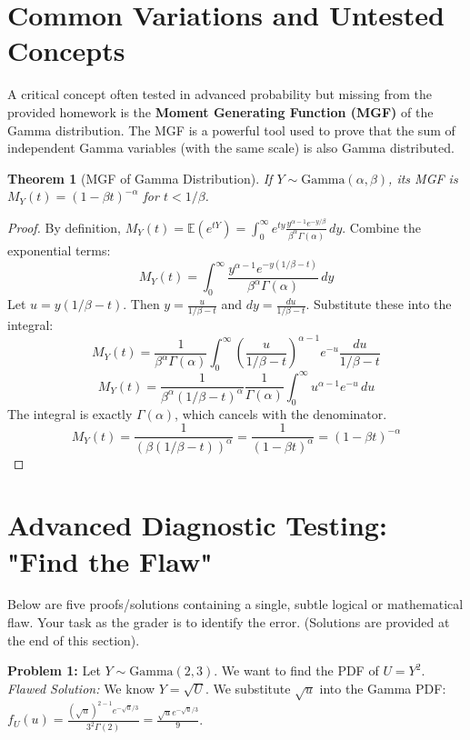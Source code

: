 \documentclass[11pt, a4paper]{article}
\newtheorem{theorem}{Theorem}[section]
\theoremstyle{definition}
\theoremstyle{remark}
\newcommand{\E}{\mathbb{E}}
\begin{document}
\section{Common Variations and Untested Concepts}

A critical concept often tested in advanced probability but missing from the provided homework is the \textbf{Moment Generating Function (MGF)} of the Gamma distribution. The MGF is a powerful tool used to prove that the sum of independent Gamma variables (with the same scale) is also Gamma distributed.

\begin{theorem}[MGF of Gamma Distribution]
If $Y \sim \text{Gamma}(\alpha, \beta)$, its MGF is $M_Y(t) = (1 - \beta t)^{-\alpha}$ for $t < 1/\beta$.
\end{theorem}
\begin{proof}
By definition, $M_Y(t) = \E(e^{tY}) = \int_0^\infty e^{ty} \frac{y^{\alpha-1}e^{-y/\beta}}{\beta^\alpha \Gamma(\alpha)} \, dy$.
Combine the exponential terms:
\[ M_Y(t) = \int_0^\infty \frac{y^{\alpha-1} e^{-y(1/\beta - t)}}{\beta^\alpha \Gamma(\alpha)} \, dy \]
Let $u = y(1/\beta - t)$. Then $y = \frac{u}{1/\beta - t}$ and $dy = \frac{du}{1/\beta - t}$.
Substitute these into the integral:
\[ M_Y(t) = \frac{1}{\beta^\alpha \Gamma(\alpha)} \int_0^\infty \left( \frac{u}{1/\beta - t} \right)^{\alpha-1} e^{-u} \frac{du}{1/\beta - t} \]
\[ M_Y(t) = \frac{1}{\beta^\alpha (1/\beta - t)^\alpha} \frac{1}{\Gamma(\alpha)} \int_0^\infty u^{\alpha-1} e^{-u} \, du \]
The integral is exactly $\Gamma(\alpha)$, which cancels with the denominator.
\[ M_Y(t) = \frac{1}{(\beta(1/\beta - t))^\alpha} = \frac{1}{(1 - \beta t)^\alpha} = (1 - \beta t)^{-\alpha} \]
\end{proof}

\section{Advanced Diagnostic Testing: "Find the Flaw"}

Below are five proofs/solutions containing a single, subtle logical or mathematical flaw. Your task as the grader is to identify the error. (Solutions are provided at the end of this section).

\textbf{Problem 1:} Let $Y \sim \text{Gamma}(2, 3)$. We want to find the PDF of $U = Y^2$.
\textit{Flawed Solution:} We know $Y = \sqrt{U}$. We substitute $\sqrt{u}$ into the Gamma PDF:
$f_U(u) = \frac{(\sqrt{u})^{2-1} e^{-\sqrt{u}/3}}{3^2 \Gamma(2)} = \frac{\sqrt{u} e^{-\sqrt{u}/3}}{9}$.
\end{document}
